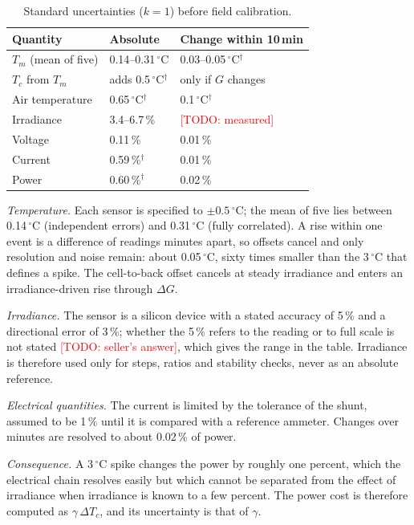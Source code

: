 \documentclass[conference]{IEEEtran}
\newcommand{\degC}{\ensuremath{^\circ}C}
\newcommand{\todo}[1]{\textcolor{red}{[TODO: #1]}}
\begin{document}
\begin{table}[t]
\caption{Standard uncertainties ($k=1$) before field calibration.}
\label{tab:uncertainty}
\centering
\begin{tabular}{lll}
\toprule
Quantity & Absolute & Change within 10\,min \\
\midrule
$T_m$ (mean of five) & 0.14--0.31\,\degC & 0.03--0.05\,\degC$^\dagger$ \\
$T_c$ from $T_m$ & adds 0.5\,\degC$^\dagger$ & only if $G$ changes \\
Air temperature & 0.65\,\degC$^\dagger$ & 0.1\,\degC$^\dagger$ \\
Irradiance & 3.4--6.7\,\% & \todo{measured} \\
Voltage & 0.11\,\% & 0.01\,\% \\
Current & 0.59\,\%$^\dagger$ & 0.01\,\% \\
Power & 0.60\,\%$^\dagger$ & 0.02\,\% \\
\bottomrule
\end{tabular}
\end{table}

\emph{Temperature.} Each sensor is specified to $\pm0.5$\,\degC; the mean of five lies
between 0.14\,\degC{} (independent errors) and 0.31\,\degC{} (fully correlated). A rise
within one event is a difference of readings minutes apart, so offsets cancel and only
resolution and noise remain: about 0.05\,\degC, sixty times smaller than the 3\,\degC{}
that defines a spike. The cell-to-back offset \cite{king2004} cancels at steady
irradiance and enters an irradiance-driven rise through $\Delta G$.

\emph{Irradiance.} The sensor is a silicon device with a stated accuracy of 5\,\% and a
directional error of 3\,\%; whether the 5\,\% refers to the reading or to full scale is
not stated \todo{seller's answer}, which gives the range in the table. Irradiance is
therefore used only for steps, ratios and stability checks, never as an absolute
reference.

\emph{Electrical quantities.} The current is limited by the tolerance of the shunt,
assumed to be 1\,\% until it is compared with a reference ammeter. Changes over minutes
are resolved to about 0.02\,\% of power.

\emph{Consequence.} A 3\,\degC{} spike changes the power by roughly one percent, which
the electrical chain resolves easily but which cannot be separated from the effect of
irradiance when irradiance is known to a few percent. The power cost is therefore
computed as $\gamma\,\Delta T_c$, and its uncertainty is that of $\gamma$.
\end{document}
